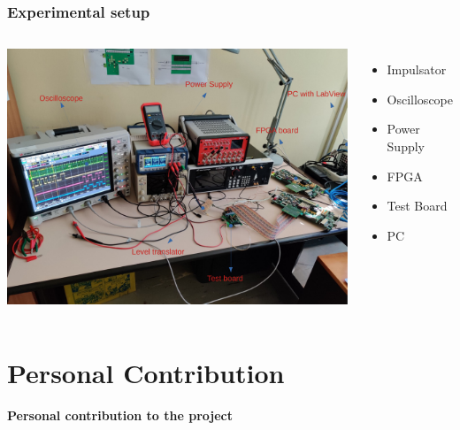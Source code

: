 \documentclass[aspectratio=169]{beamer}
\begin{document}
	\begin{frame}
	\frametitle{Experimental setup}
		\begin{columns}
			\begin{center}
				\includegraphics[width=0.95 \textwidth]{IMG/TestBench.pdf}
			\end{center}
			\begin{itemize}
				\item Impulsator
				\item Oscilloscope
				\item Power Supply
				\item FPGA
				\item Test Board
				\item PC
			\end{itemize}
		\end{columns}
		
	\end{frame}



	\section{Personal Contribution}
	
	\begin{frame}
		\begin{center}
			{\Huge {}\selectfont \color{blue} \textbf{Personal contribution to the project}}
		\end{center}
	\end{frame}
	
\end{document}
